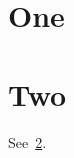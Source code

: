 \documentclass{article}
\begin{document}
\section{One}\label{sec:x}
\section{Two}\label{sec:x}
See~\ref{sec:x}.
\end{document}
